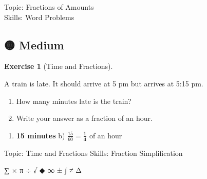 \documentclass[
  letterpaper,
  DIV=11,
  numbers=noendperiod]{scrreprt}
\providecommand{\tightlist}{%
  \setlength{\itemsep}{0pt}\setlength{\parskip}{0pt}}
\theoremstyle{definition}
\newtheorem{exercise}{Exercise}[chapter]
\theoremstyle{remark}
\begin{document}
{Topic: Fractions of Amounts}\\
{Skills: Word Problems}

\subsection{🟡 Medium}

\begin{exercise}[Time and
Fractions]\protect\hypertarget{exr-u1-time-frac}{}\label{exr-u1-time-frac}

A train is late. It should arrive at 5 pm but arrives at 5:15 pm.

\begin{enumerate}
\def\labelenumi{\alph{enumi})}
\tightlist
\item
  How many minutes late is the train?\\
\item
  Write your answer as a fraction of an hour.
\end{enumerate}

\begin{tcolorbox}[enhanced jigsaw, opacitybacktitle=0.6, coltitle=black, arc=.35mm, colframe=quarto-callout-tip-color-frame, colback=white, bottomrule=.15mm, left=2mm, colbacktitle=quarto-callout-tip-color!10!white, titlerule=0mm, opacityback=0, title=\textcolor{quarto-callout-tip-color}{\faLightbulb}\hspace{0.5em}{🔍 View Solution}, leftrule=.75mm, breakable, rightrule=.15mm, bottomtitle=1mm, toptitle=1mm, toprule=.15mm]

\begin{enumerate}
\def\labelenumi{\alph{enumi})}
\tightlist
\item
  \textbf{15 minutes} b) \(\frac{15}{60} = \mathbf{\frac{1}{4}}\) of an
  hour
\end{enumerate}

\end{tcolorbox}

{Topic: Time and Fractions} {Skills: Fraction Simplification}

\end{exercise}

∑ × π ÷ √ ◆ ∞ ± ∫ ≠ Δ
\end{document}

